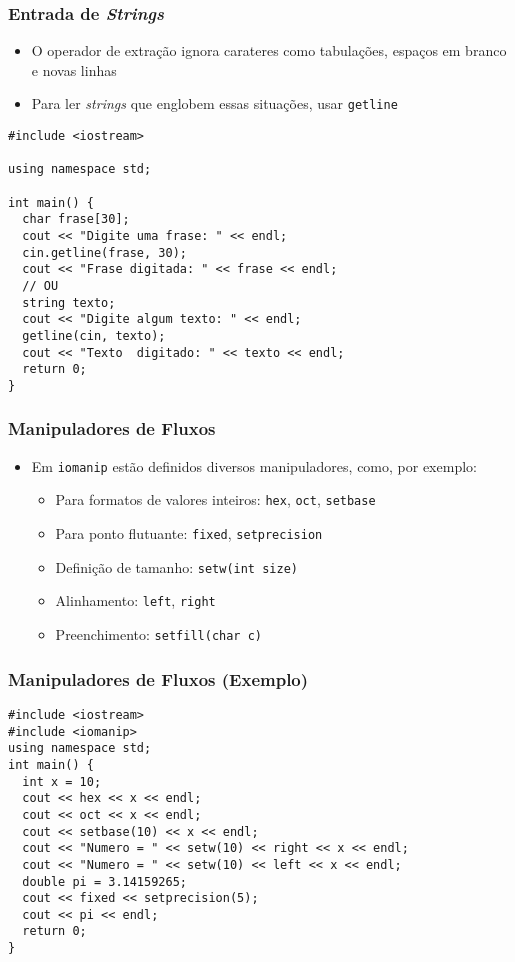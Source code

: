 \documentclass[aspectratio=169]{beamer}
\begin{document}
\begin{frame}[fragile]\frametitle{Entrada de \emph{Strings}}
\begin{itemize}
	\item O operador de extração ignora carateres como tabulações, espaços em branco e novas linhas
	\item Para ler \emph{strings} que englobem essas situações, usar \texttt{getline}
\end{itemize}
\begin{lstlisting}[basicstyle=\ttfamily\scriptsize]
#include <iostream>

using namespace std;

int main() {
  char frase[30];
  cout << "Digite uma frase: " << endl;
  cin.getline(frase, 30);
  cout << "Frase digitada: " << frase << endl;
  // OU
  string texto;
  cout << "Digite algum texto: " << endl;
  getline(cin, texto);
  cout << "Texto  digitado: " << texto << endl;
  return 0;
}
\end{lstlisting}
\end{frame}

\begin{frame}\frametitle{Manipuladores de Fluxos}
\begin{itemize}
	\item Em \texttt{iomanip} estão definidos diversos manipuladores, como, por exemplo:
	\begin{itemize}
		\item Para formatos de valores inteiros: \texttt{hex}, \texttt{oct}, \texttt{setbase}
		\item Para ponto flutuante: \texttt{fixed}, \texttt{setprecision}
		\item Definição de tamanho: \texttt{setw(int size)}
		\item Alinhamento: \texttt{left}, \texttt{right}
		\item Preenchimento: \texttt{setfill(char c)}
	\end{itemize}
\end{itemize}
\end{frame}

\begin{frame}[fragile]\frametitle{Manipuladores de Fluxos (Exemplo)}
\begin{lstlisting}
#include <iostream>
#include <iomanip>
using namespace std;
int main() {
  int x = 10;
  cout << hex << x << endl;
  cout << oct << x << endl;
  cout << setbase(10) << x << endl;
  cout << "Numero = " << setw(10) << right << x << endl;
  cout << "Numero = " << setw(10) << left << x << endl;
  double pi = 3.14159265;
  cout << fixed << setprecision(5);
  cout << pi << endl;
  return 0;
}
\end{lstlisting}
\end{frame}
\end{document}
